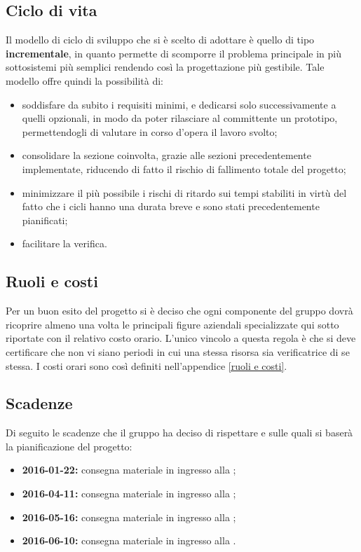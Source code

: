 \documentclass[12pt,a4paper]{article}
\begin{document}
\subsection{Ciclo di vita}
Il modello di ciclo di sviluppo che si è scelto di adottare è quello di tipo \textbf{incrementale}, in quanto permette di scomporre il problema principale in più sottosistemi più semplici rendendo così la progettazione più gestibile. Tale modello offre quindi la possibilità di:
\begin{itemize}
	\item soddisfare da subito i requisiti minimi, e dedicarsi solo successivamente a quelli opzionali, in modo da poter rilasciare al committente un prototipo, permettendogli di valutare in corso d'opera il lavoro svolto;
	\item consolidare la sezione coinvolta, grazie alle sezioni precedentemente implementate, riducendo di fatto il rischio di fallimento totale del progetto;
	\item minimizzare il più possibile i rischi di ritardo sui tempi stabiliti in virtù del fatto che i cicli hanno una durata breve e sono stati precedentemente pianificati;
	\item facilitare la verifica.
\end{itemize}

\subsection{Ruoli e costi}
Per un buon esito del progetto si è deciso che ogni componente del gruppo dovrà ricoprire almeno una volta le principali figure aziendali specializzate qui sotto riportate con il relativo costo orario. L'unico vincolo a questa regola è che si deve certificare che non vi siano periodi in cui una stessa risorsa sia verificatrice di se stessa. I costi orari sono così definiti nell'appendice \ref{ruoli e costi}. 

\subsection{Scadenze}
Di seguito le scadenze che il gruppo \nomeGruppo{} ha deciso di rispettare e sulle quali si baserà la pianificazione del progetto:
\begin{itemize}
	\item \textbf{2016-01-22:} consegna materiale in ingresso alla \RR;
	\item \textbf{2016-04-11:} consegna materiale in ingresso alla \RP;
	\item \textbf{2016-05-16:} consegna materiale in ingresso alla \RQ;
	\item \textbf{2016-06-10:} consegna materiale in ingresso alla \RA.
\end{itemize}
\end{document}
